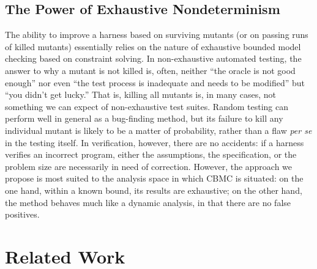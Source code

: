 \documentclass{svjour3}
\begin{document}
\subsection{The Power of Exhaustive Nondeterminism}

The ability to improve a harness based on surviving mutants (or on
passing runs of killed mutants) essentially relies on the nature of
exhaustive bounded model checking based on constraint solving.  In
non-exhaustive automated testing, the answer to why a mutant is not
killed is, often, neither ``the oracle is not good enough'' nor even
``the test process is inadequate and needs to be modified'' but ``you
didn't get lucky.''  That is, killing all mutants is, in many cases,
not something we can expect of non-exhaustive test suites.  Random
testing \cite{HamletOnly,ICSEDiff} can perform well in general as a
bug-finding method, but its failure to kill any individual mutant is
likely to be a matter of probability, rather than a flaw \emph{per se}
in the testing itself.  In verification, however, there are no
accidents: if a harness verifies an incorrect program, either the
assumptions, the specification, or the problem size are necessarily in
need of correction.  However, the approach we propose is most suited
to the analysis space in which CBMC is situated: on the one hand,
within a known bound, its results are exhaustive; on the other hand,
the method behaves much like a dynamic analysis, in that there are no
false positives.

\section{Related Work}
\end{document}
